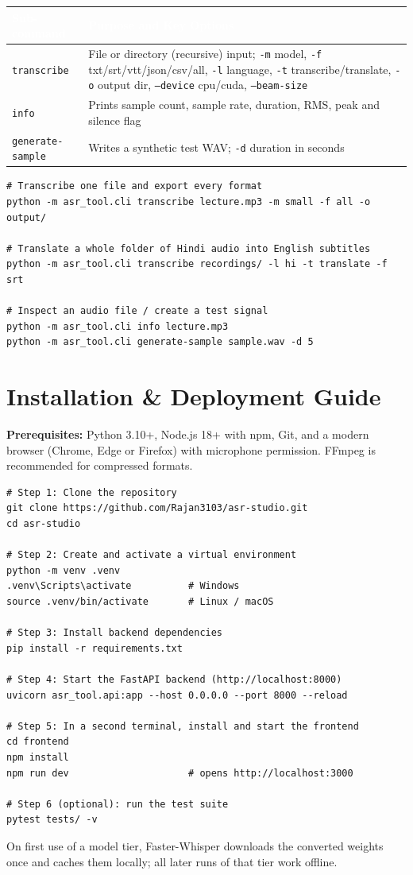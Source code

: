 \documentclass[11pt,a4paper]{article}
\newcommand{\thc}[1]{\textcolor{white}{\bfseries #1}}
\newcommand{\headrow}{\rowcolor{headblue}}
\begin{document}
\begin{tabularx}{\textwidth}{|L{3.3cm}|Y|}
\hline
\headrow \thc{Sub-command} & \thc{Purpose and Key Options} \\ \hline
\texttt{transcribe} & File or directory (recursive) input; \texttt{-m} model, \texttt{-f} txt/srt/vtt/json/csv/all, \texttt{-l} language, \texttt{-t} transcribe/translate, \texttt{-o} output dir, \texttt{--device} cpu/cuda, \texttt{--beam-size} \\ \hline
\texttt{info} & Prints sample count, sample rate, duration, RMS, peak and silence flag \\ \hline
\texttt{generate-sample} & Writes a synthetic test WAV; \texttt{-d} duration in seconds \\ \hline
\end{tabularx}

\begin{lstlisting}[style=sh]
# Transcribe one file and export every format
python -m asr_tool.cli transcribe lecture.mp3 -m small -f all -o output/

# Translate a whole folder of Hindi audio into English subtitles
python -m asr_tool.cli transcribe recordings/ -l hi -t translate -f srt

# Inspect an audio file / create a test signal
python -m asr_tool.cli info lecture.mp3
python -m asr_tool.cli generate-sample sample.wav -d 5
\end{lstlisting}

\section{Installation \& Deployment Guide}
\textbf{Prerequisites:} Python 3.10+, Node.js 18+ with npm, Git, and a modern browser (Chrome, Edge or Firefox) with microphone permission. FFmpeg is recommended for compressed formats.

\begin{lstlisting}[style=sh]
# Step 1: Clone the repository
git clone https://github.com/Rajan3103/asr-studio.git
cd asr-studio

# Step 2: Create and activate a virtual environment
python -m venv .venv
.venv\Scripts\activate          # Windows
source .venv/bin/activate       # Linux / macOS

# Step 3: Install backend dependencies
pip install -r requirements.txt

# Step 4: Start the FastAPI backend (http://localhost:8000)
uvicorn asr_tool.api:app --host 0.0.0.0 --port 8000 --reload

# Step 5: In a second terminal, install and start the frontend
cd frontend
npm install
npm run dev                     # opens http://localhost:3000

# Step 6 (optional): run the test suite
pytest tests/ -v
\end{lstlisting}
On first use of a model tier, Faster-Whisper downloads the converted weights once and caches them locally; all later runs of that tier work offline.
\end{document}
